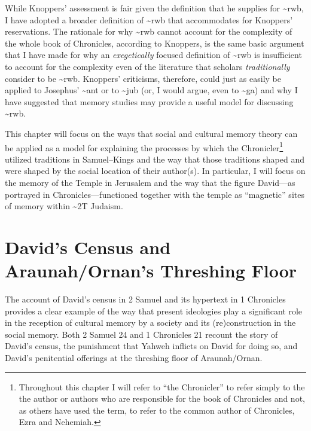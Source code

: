While Knoppers' assessment is fair given the definition that he supplies
for \textasciitilde{}rwb, I have adopted a broader definition of
\textasciitilde{}rwb that accommodates for Knoppers' reservations. The
rationale for why \textasciitilde{}rwb cannot account for the complexity
of the whole book of Chronicles, according to Knoppers, is the same
basic argument that I have made for why an \emph{exegetically} focused
definition of \textasciitilde{}rwb is insufficient to account for the
complexity even of the literature that scholars \emph{traditionally}
consider to be \textasciitilde{}rwb. Knoppers' criticisms, therefore,
could just as easily be applied to Josephus' \textasciitilde{}ant or to
\textasciitilde{}jub (or, I would argue, even to \textasciitilde{}ga)
and why I have suggested that memory studies may provide a useful model
for discussing \textasciitilde{}rwb.

This chapter will focus on the ways that social and cultural memory
theory can be applied as a model for explaining the processes by which
the Chronicler\footnote{Throughout this chapter I will refer to ``the
  Chronicler'' to refer simply to the the author or authors who are
  responsible for the book of Chronicles and not, as others have used
  the term, to refer to the common author of Chronicles, Ezra and
  Nehemiah.} utilized traditions in Samuel--Kings and the way that those
traditions shaped and were shaped by the social location of their
author(s). In particular, I will focus on the memory of the Temple in
Jerusalem and the way that the figure David---as portrayed in
Chronicles---functioned together with the temple as ``magnetic'' sites
of memory within \textasciitilde{}2T
Judaism.\autocite[73]{benzvi_st2017}

\hypertarget{davids-census-and-araunahornans-threshing-floor}{%
\section{David's Census and Araunah/Ornan's Threshing
Floor}\label{davids-census-and-araunahornans-threshing-floor}}

The account of David's census in 2 Samuel and its hypertext in 1
Chronicles provides a clear example of the way that present ideologies
play a significant role in the reception of cultural memory by a society
and its (re)construction in the social memory. Both 2 Samuel 24 and 1
Chronicles 21 recount the story of David's census, the punishment that
Yahweh inflicts on David for doing so, and David's penitential offerings
at the threshing floor of Araunah/Ornan.


